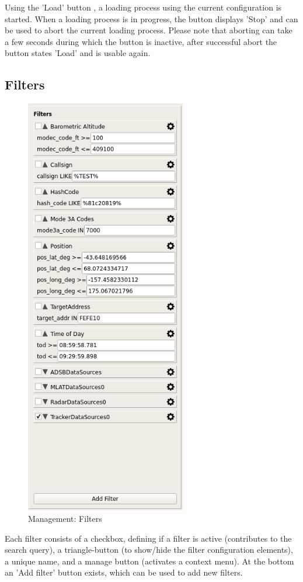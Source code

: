 Using the 'Load' button , a loading process using the current configuration is started. When a loading process is in progress, the button displays 'Stop' and can be used to abort the current loading process. Please note that aborting can take a few seconds during which the button is inactive, after successful abort the button states 'Load' and is usable again.

\subsection{Filters}

\begin{figure}[H]
  \center
    \includegraphics[width=7cm,frame]{../screenshots/management_filters.png}
  \caption{Management: Filters}
  \label{fig:management_filters}
\end{figure}

Each filter consists of a checkbox, defining if a filter is active (contributes to the search query), a triangle-button (to show/hide the filter configuration elements), a unique name, and a manage button (activates a context menu). At the bottom an 'Add filter' button exists, which can be used to add new filters. \\

